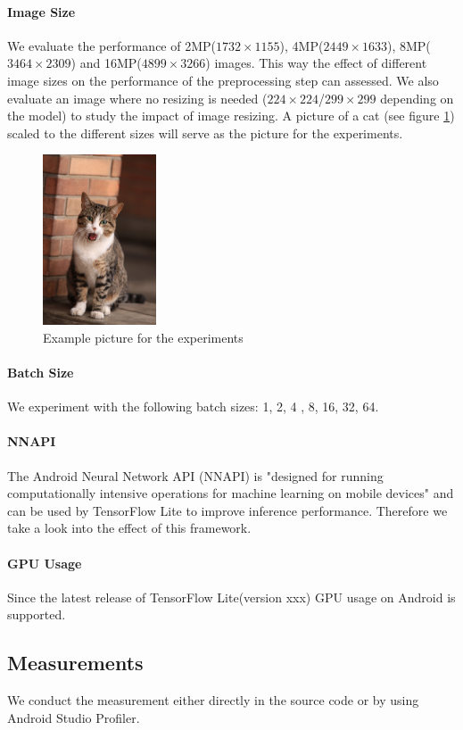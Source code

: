 \paragraph{Image Size}
We evaluate the performance of 2MP($1732\times1155$), 4MP($2449\times1633$), 8MP($3464\times2309$) and 16MP($4899\times3266$) images. This way the effect of different image sizes on the performance of the preprocessing step can assessed. We also evaluate an image where no resizing is needed ($224\times224$/$299\times299$ depending on the model) to study the impact of image resizing. A picture of a cat (see figure \ref{fig:cat}) scaled to the different sizes will serve as the picture for the experiments.
\begin{figure}[H]
\centering
\includegraphics[width=0.3\textwidth]{./Bilder/European_cat_02_16_mp.jpg}
\caption{Example picture for the experiments \cite{cat}}
\label{fig:cat}
\end{figure}
\paragraph{Batch Size}
We experiment with the following batch sizes: 1, 2, 4 , 8, 16, 32, 64.
\paragraph{NNAPI}
The Android Neural Network API (NNAPI)
is "designed for running computationally intensive operations for machine learning on mobile devices" \cite{NNAPI} and can be used by TensorFlow Lite to improve inference performance. Therefore we take a look into the effect of this framework.
\paragraph{GPU Usage}
Since the latest release of TensorFlow Lite(version xxx) GPU usage on Android is supported. 

\subsection{Measurements}
We conduct the measurement either directly in the source code or by using Android Studio Profiler.
